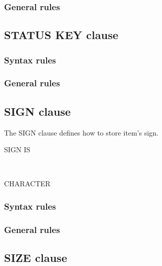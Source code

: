 \subsubsection{General rules}

\subsection{STATUS KEY clause}

\begin{syntax}[\deletedcolour]
\end{syntax}

\subsubsection{Syntax rules}

\subsubsection{General rules}

\subsection{SIGN clause}

The SIGN clause defines how to store item's sign.

\begin{syntax}
  SIGN IS
  \begin{1=}
     \\
  \end{1=}
  \begin{0-1}
     CHARACTER
  \end{0-1}
\end{syntax}

\subsubsection{Syntax rules}

\subsubsection{General rules}

\subsection{SIZE clause}

